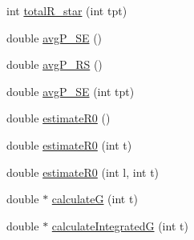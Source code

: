 \begin{DoxyCompactItemize}
\item 
int \hyperlink{classSpatialSEIR_1_1ModelContext_a5b486f6b0c97d26d106dffd007c1b515}{total\-R\-\_\-star} (int tpt)
\item 
double \hyperlink{classSpatialSEIR_1_1ModelContext_af1258e6c426000d483ac4a06220281a7}{avg\-P\-\_\-\-S\-E} ()
\item 
double \hyperlink{classSpatialSEIR_1_1ModelContext_a6c76f5d9d10b7dca77e02a8304f26203}{avg\-P\-\_\-\-R\-S} ()
\item 
double \hyperlink{classSpatialSEIR_1_1ModelContext_a9cb6ca074aff51c1f789b81111c7e153}{avg\-P\-\_\-\-S\-E} (int tpt)
\item 
double \hyperlink{classSpatialSEIR_1_1ModelContext_aa450557786a891db5bb3338a047b1544}{estimate\-R0} ()
\item 
double \hyperlink{classSpatialSEIR_1_1ModelContext_ac392c01b668dfbaaede3c5468a597513}{estimate\-R0} (int t)
\item 
double \hyperlink{classSpatialSEIR_1_1ModelContext_aceb1cb88b80e72b00d560871218c932c}{estimate\-R0} (int l, int t)
\item 
double $\ast$ \hyperlink{classSpatialSEIR_1_1ModelContext_a26650599b445d706e833ad33bbc4ad71}{calculate\-G} (int t)
\item 
double $\ast$ \hyperlink{classSpatialSEIR_1_1ModelContext_a637ceadc71ad656202e3d3fa21d01ade}{calculate\-Integrated\-G} (int t)
\end{DoxyCompactItemize}
